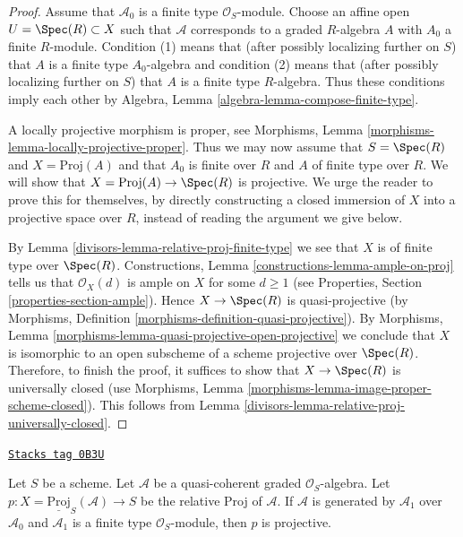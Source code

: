 \begin{proof}

Assume that $\mathcal{A}_0$ is a finite type $\mathcal{O}_S$-module.
Choose an affine open $U = \Spec(R) \subset X$ such that $\mathcal{A}$
corresponds to a graded $R$-algebra $A$ with $A_0$ a finite $R$-module.
Condition (1) means that (after possibly localizing further on $S$)
that $A$ is a finite type $A_0$-algebra and condition (2) means that
(after possibly localizing further on $S$) that $A$ is a finite type
$R$-algebra. Thus these conditions imply each other by
Algebra, Lemma \ref{algebra-lemma-compose-finite-type}.

\medskip\noindent
A locally projective morphism is proper, see
Morphisms, Lemma \ref{morphisms-lemma-locally-projective-proper}.
Thus we may now assume that $S = \Spec(R)$ and $X = \text{Proj}(A)$
and that $A_0$ is finite over $R$ and $A$ of finite type over $R$.
We will show that $X = \text{Proj}(A) \to \Spec(R)$ is projective.
We urge the reader to prove this for themselves, by directly constructing
a closed immersion of $X$ into a projective space over $R$, instead
of reading the argument we give below.

\medskip\noindent
By Lemma \ref{divisors-lemma-relative-proj-finite-type}
we see that $X$ is of finite type over $\Spec(R)$.
Constructions, Lemma \ref{constructions-lemma-ample-on-proj}
tells us that $\mathcal{O}_X(d)$ is ample on $X$ for some $d \geq 1$
(see Properties, Section \ref{properties-section-ample}).
Hence $X \to \Spec(R)$ is quasi-projective (by
Morphisms, Definition \ref{morphisms-definition-quasi-projective}).
By Morphisms, Lemma \ref{morphisms-lemma-quasi-projective-open-projective}
we conclude that $X$ is isomorphic to an open subscheme of a scheme
projective over $\Spec(R)$. Therefore, to finish the proof, it suffices
to show that $X \to \Spec(R)$ is universally closed (use
Morphisms, Lemma \ref{morphisms-lemma-image-proper-scheme-closed}).
This follows from Lemma \ref{divisors-lemma-relative-proj-universally-closed}.
\end{proof}

\begin{lemma}
\label{divisors-lemma-relative-proj-projective}
\href{https://stacks.math.columbia.edu/tag/0B3U}{\texttt{Stacks tag 0B3U}}

Let $S$ be a scheme. Let $\mathcal{A}$ be a quasi-coherent graded
$\mathcal{O}_S$-algebra. Let
$p : X = \underline{\text{Proj}}_S(\mathcal{A}) \to S$ be the relative
Proj of $\mathcal{A}$. If $\mathcal{A}$ is generated by
$\mathcal{A}_1$ over $\mathcal{A}_0$ and $\mathcal{A}_1$
is a finite type $\mathcal{O}_S$-module, then $p$ is projective.
\end{lemma}

